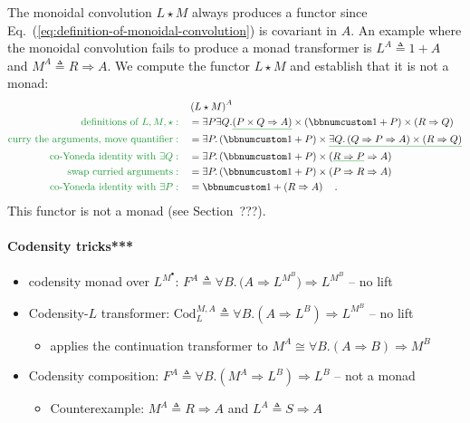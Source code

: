The monoidal convolution $L\star M$ always produces a functor since
Eq.~(\ref{eq:definition-of-monoidal-convolution}) is covariant in
$A$. An example where the monoidal convolution fails to produce a
monad transformer is $L^{A}\triangleq1+A$ and $M^{A}\triangleq R\Rightarrow A$.
We compute the functor $L\star M$ and establish that it is not a
monad:
\begin{align*}
 & \left(L\star M\right)^{A}\\
{\color{greenunder}\text{definitions of }L,M,\star:}\quad & =\exists P\exists Q.\gunderline{\left(P\times Q\Rightarrow A\right)}\times\left(\bbnum 1+P\right)\times\left(R\Rightarrow Q\right)\\
{\color{greenunder}\text{curry the arguments, move quantifier}:}\quad & =\exists P.\left(\bbnum 1+P\right)\times\gunderline{\exists Q.\left(Q\Rightarrow P\Rightarrow A\right)\times\left(R\Rightarrow Q\right)}\\
{\color{greenunder}\text{co-Yoneda identity with }\exists Q:}\quad & =\exists P.\left(\bbnum 1+P\right)\times\left(\gunderline{R\Rightarrow P}\Rightarrow A\right)\\
{\color{greenunder}\text{swap curried arguments}:}\quad & =\exists P.\left(\bbnum 1+P\right)\times\left(P\Rightarrow R\Rightarrow A\right)\\
{\color{greenunder}\text{co-Yoneda identity with }\exists P:}\quad & =\bbnum 1+\left(R\Rightarrow A\right)\quad.
\end{align*}
This functor is not a monad (see Section~???).

\paragraph{Codensity tricks{*}{*}{*}}
\begin{itemize}
\item codensity monad over $L^{M^{\bullet}}$: $F^{A}\triangleq\forall B.\,\big(A\Rightarrow L^{M^{B}}\big)\Rightarrow L^{M^{B}}$
– no lift 
\item Codensity-$L$ transformer: $\text{Cod}_{L}^{M,A}\triangleq\forall B.\left(A\Rightarrow L^{B}\right)\Rightarrow L^{M^{B}}$
– no lift 
\begin{itemize}
\item applies the continuation transformer to $M^{A}\cong\forall B.\left(A\Rightarrow B\right)\Rightarrow M^{B}$
\end{itemize}
\item Codensity composition: $F^{A}\triangleq\forall B.\left(M^{A}\Rightarrow L^{B}\right)\Rightarrow L^{B}$
– not a monad
\begin{itemize}
\item Counterexample: $M^{A}\triangleq R\Rightarrow A$ and $L^{A}\triangleq S\Rightarrow A$
\end{itemize}
\end{itemize}

